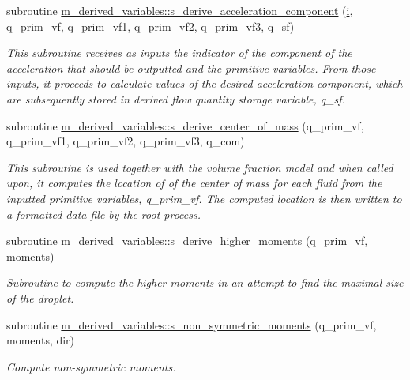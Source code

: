 \begin{DoxyCompactItemize}
subroutine \hyperlink{namespacem__derived__variables_a5c6df8a69a463ae2c56fb2c2bb8c59a7}{m\+\_\+derived\+\_\+variables\+::s\+\_\+derive\+\_\+acceleration\+\_\+component} (\hyperlink{m__rhs_8f90_aaea4baed8fd8b780f6938f0dc1fb0f72}{i}, q\+\_\+prim\+\_\+vf, q\+\_\+prim\+\_\+vf1, q\+\_\+prim\+\_\+vf2, q\+\_\+prim\+\_\+vf3, q\+\_\+sf)
\begin{DoxyCompactList}\small\item\em This subroutine receives as inputs the indicator of the component of the acceleration that should be outputted and the primitive variables. From those inputs, it proceeds to calculate values of the desired acceleration component, which are subsequently stored in derived flow quantity storage variable, q\+\_\+sf. \end{DoxyCompactList}\item 
subroutine \hyperlink{namespacem__derived__variables_a1a849dc545128f9a6de155bed61035ff}{m\+\_\+derived\+\_\+variables\+::s\+\_\+derive\+\_\+center\+\_\+of\+\_\+mass} (q\+\_\+prim\+\_\+vf, q\+\_\+prim\+\_\+vf1, q\+\_\+prim\+\_\+vf2, q\+\_\+prim\+\_\+vf3, q\+\_\+com)
\begin{DoxyCompactList}\small\item\em This subroutine is used together with the volume fraction model and when called upon, it computes the location of of the center of mass for each fluid from the inputted primitive variables, q\+\_\+prim\+\_\+vf. The computed location is then written to a formatted data file by the root process. \end{DoxyCompactList}\item 
subroutine \hyperlink{namespacem__derived__variables_ab28af564606ca901d3953e6012e9a452}{m\+\_\+derived\+\_\+variables\+::s\+\_\+derive\+\_\+higher\+\_\+moments} (q\+\_\+prim\+\_\+vf, moments)
\begin{DoxyCompactList}\small\item\em Subroutine to compute the higher moments in an attempt to find the maximal size of the droplet. \end{DoxyCompactList}\item 
subroutine \hyperlink{namespacem__derived__variables_a2ee18c156bb444c6ab73d4762960ef67}{m\+\_\+derived\+\_\+variables\+::s\+\_\+non\+\_\+symmetric\+\_\+moments} (q\+\_\+prim\+\_\+vf, moments, dir)
\begin{DoxyCompactList}\small\item\em Compute non-\/symmetric moments. \end{DoxyCompactList}\item 

\end{DoxyCompactItemize}
